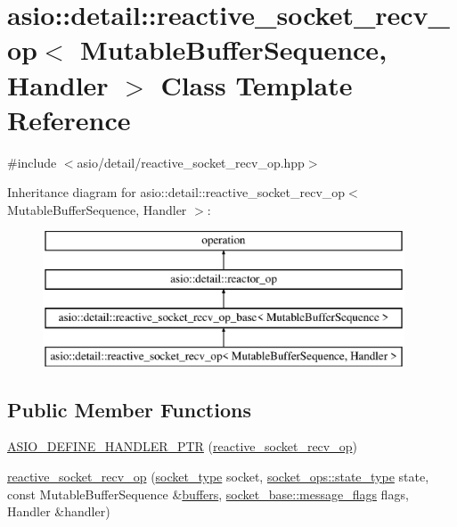 \hypertarget{classasio_1_1detail_1_1reactive__socket__recv__op}{}\section{asio\+:\+:detail\+:\+:reactive\+\_\+socket\+\_\+recv\+\_\+op$<$ Mutable\+Buffer\+Sequence, Handler $>$ Class Template Reference}
\label{classasio_1_1detail_1_1reactive__socket__recv__op}


{\ttfamily \#include $<$asio/detail/reactive\+\_\+socket\+\_\+recv\+\_\+op.\+hpp$>$}

Inheritance diagram for asio\+:\+:detail\+:\+:reactive\+\_\+socket\+\_\+recv\+\_\+op$<$ Mutable\+Buffer\+Sequence, Handler $>$\+:\begin{figure}[H]
\begin{center}
\leavevmode
\includegraphics[height=4.000000cm]{classasio_1_1detail_1_1reactive__socket__recv__op}
\end{center}
\end{figure}
\subsection*{Public Member Functions}
\begin{DoxyCompactItemize}
\item 
\hyperlink{classasio_1_1detail_1_1reactive__socket__recv__op_a52abe5194c38ad0826ced0754eaef582}{A\+S\+I\+O\+\_\+\+D\+E\+F\+I\+N\+E\+\_\+\+H\+A\+N\+D\+L\+E\+R\+\_\+\+P\+T\+R} (\hyperlink{classasio_1_1detail_1_1reactive__socket__recv__op}{reactive\+\_\+socket\+\_\+recv\+\_\+op})
\item 
\hyperlink{classasio_1_1detail_1_1reactive__socket__recv__op_a15c5dc4ad1331f8c1296c969b0030d66}{reactive\+\_\+socket\+\_\+recv\+\_\+op} (\hyperlink{namespaceasio_1_1detail_a6798c771dd84b79798b1a08150706ea9}{socket\+\_\+type} socket, \hyperlink{namespaceasio_1_1detail_1_1socket__ops_a5ce32ee297edef8833113ea35a933054}{socket\+\_\+ops\+::state\+\_\+type} state, const Mutable\+Buffer\+Sequence \&\hyperlink{group__async__read_ga54dede45c3175148a77fe6635222c47d}{buffers}, \hyperlink{classasio_1_1socket__base_ac3cf77465dfedfe1979b5415cf32cc94}{socket\+\_\+base\+::message\+\_\+flags} flags, Handler \&handler)
\end{DoxyCompactItemize}
